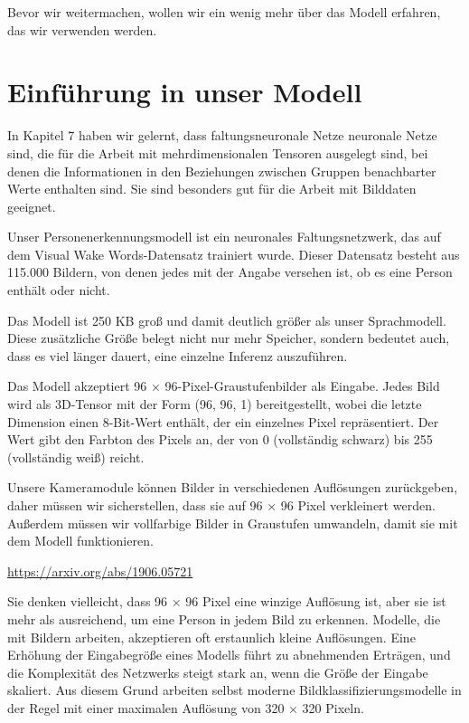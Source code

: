 Bevor wir weitermachen, wollen wir ein wenig mehr über das Modell erfahren, das wir verwenden werden.

\section{Einführung in unser Modell}

In Kapitel 7 haben wir gelernt, dass faltungsneuronale Netze neuronale Netze sind, die für die Arbeit mit mehrdimensionalen Tensoren ausgelegt sind, bei denen die Informationen in den Beziehungen zwischen Gruppen benachbarter Werte enthalten sind. Sie sind besonders gut für die Arbeit mit Bilddaten geeignet.

Unser Personenerkennungsmodell ist ein neuronales Faltungsnetzwerk, das auf dem Visual Wake Words-Datensatz trainiert wurde. Dieser Datensatz besteht aus 115.000 Bildern, von denen jedes mit der Angabe versehen ist, ob es eine Person enthält oder nicht.

Das Modell ist 250 KB groß und damit deutlich größer als unser Sprachmodell. Diese zusätzliche Größe belegt nicht nur mehr Speicher, sondern bedeutet auch, dass es viel länger dauert, eine einzelne Inferenz auszuführen.

Das Modell akzeptiert 96 × 96-Pixel-Graustufenbilder als Eingabe. Jedes Bild wird als 3D-Tensor mit der Form (96, 96, 1) bereitgestellt, wobei die letzte Dimension einen 8-Bit-Wert enthält, der ein einzelnes Pixel repräsentiert. Der Wert gibt den Farbton des Pixels an, der von 0 (vollständig schwarz) bis 255 (vollständig weiß) reicht.

Unsere Kameramodule können Bilder in verschiedenen Auflösungen zurückgeben, daher müssen wir sicherstellen, dass sie auf 96 × 96 Pixel verkleinert werden. Außerdem müssen wir vollfarbige Bilder in Graustufen umwandeln, damit sie mit dem Modell funktionieren.

\url{https://arxiv.org/abs/1906.05721}


Sie denken vielleicht, dass 96 × 96 Pixel eine winzige Auflösung ist, aber sie ist mehr als ausreichend, um eine Person in jedem Bild zu erkennen. Modelle, die mit Bildern arbeiten, akzeptieren oft erstaunlich kleine Auflösungen. Eine Erhöhung der Eingabegröße eines Modells führt zu abnehmenden Erträgen, und die Komplexität des Netzwerks steigt stark an, wenn die Größe der Eingabe skaliert. Aus diesem Grund arbeiten selbst moderne Bildklassifizierungsmodelle in der Regel mit einer maximalen Auflösung von 320 × 320 Pixeln.

